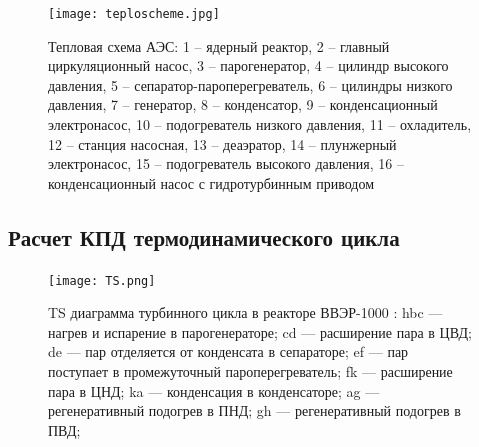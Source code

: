 \begin{figure}[H]
	\begin{center}
		\texttt{[image: teploscheme.jpg]}
		\caption{Тепловая схема АЭС: 1 – ядерный реактор, 2 – главный
циркуляционный насос, 3 – парогенератор, 4 – цилиндр высокого давления, 5 –
сепаратор-пароперегреватель, 6 – цилиндры низкого давления, 7 – генератор, 8
– конденсатор, 9 – конденсационный электронасос, 10 – подогреватель низкого
давления, 11 – охладитель, 12 – станция насосная, 13 – деаэратор, 14 –
плунжерный электронасос, 15 – подогреватель высокого давления, 16 –
конденсационный насос с гидротурбинным приводом}
		\label{pic:teplocheme} %
	\end{center}
\end{figure}


\subsection{Расчет КПД термодинамического цикла}


\begin{figure}[H]
	\begin{center}
		\texttt{[image: TS.png]}
		\caption{ T­S диаграмма турбинного цикла в реакторе ВВЭР­-1000 : hbc — нагрев и испарение в парогенераторе; cd — расширение пара в ЦВД; de — пар отделяется от конденсата в сепараторе; ef — пар поступает в промежуточный пароперегреватель; fk — расширение пара в ЦНД; ka — конденсация в конден­саторе; ag — регенеративный подогрев в ПНД; gh — регенеративный подогрев в ПВД;
        }
		\label{pic:TS} %
	\end{center}
\end{figure}

